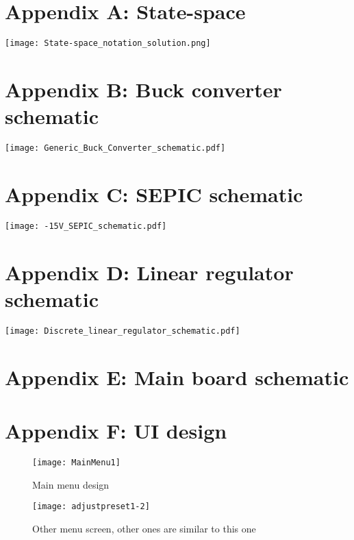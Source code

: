 \section*{Appendix A: State-space}


    \texttt{[image: State-space\_notation\_solution.png]}
\newpage
\newpage

\section*{Appendix B: Buck converter schematic}
\texttt{[image: Generic\_Buck\_Converter\_schematic.pdf]}

\section*{Appendix C: SEPIC schematic}
\texttt{[image: -15V\_SEPIC\_schematic.pdf]}

\section*{Appendix D: Linear regulator schematic}
\texttt{[image: Discrete\_linear\_regulator\_schematic.pdf]}

\section*{Appendix E: Main board schematic}


\section*{Appendix F: UI design} \label{AppendixF}
\begin{figure}[ht]
    \texttt{[image: MainMenu1]}
    \caption{Main menu design}
    \label{fig:mainmenu}
\end{figure}

\begin{figure}[ht]
    \texttt{[image: adjustpreset1-2]}
    \caption{Other menu screen, other ones are similar to this one}
    \label{fig:adjustpresetmenu}
\end{figure}

